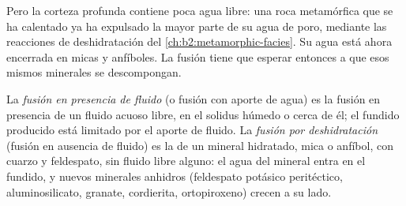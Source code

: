 \begin{omfigure}
\centering
{}
\par{}
\end{omfigure}

Pero la corteza profunda contiene poca agua libre: una roca metamórfica que se ha calentado ya ha
expulsado la mayor parte de su agua de poro, mediante las reacciones de deshidratación del
\cref{ch:b2:metamorphic-facies}. Su agua está ahora encerrada en micas y anfíboles. La fusión
tiene que esperar entonces a que esos mismos minerales se descompongan.

\begin{definition}\label{def:b2:crustal-melting:reactions}
La \emph{fusión en presencia de fluido} (o fusión con aporte de agua) es
la fusión en presencia de un fluido acuoso libre, en el solidus húmedo o cerca de él; el fundido
producido está limitado por el aporte de fluido. La \emph{fusión por deshidratación}
(fusión en ausencia de fluido) es la  de un mineral hidratado, mica o
anfíbol, con cuarzo y feldespato, sin fluido libre alguno: el agua del mineral
entra en el fundido, y nuevos minerales anhidros (feldespato potásico peritéctico, aluminosilicato,
granate, cordierita, ortopiroxeno) crecen a su lado.
\end{definition}

